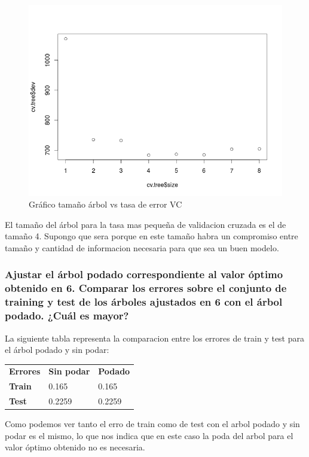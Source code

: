 \begin{figure}[H]
\centering
\includegraphics[scale=0.60]{ej2-6.png}
\caption{Gráfico tamaño árbol vs tasa de error VC}
\label{}
\end{figure}

El tamaño del árbol para la tasa mas pequeña de validacion cruzada es el de tamaño 4. Supongo que sera porque en este tamaño habra un compromiso entre tamaño y cantidad de informacion necesaria para que sea un buen modelo.

\subsubsection{Ajustar el árbol podado correspondiente al valor óptimo obtenido en 6. Comparar los errores sobre el conjunto de training y test de los árboles ajustados en 6 con el árbol podado. ¿Cuál es mayor?}
La siguiente tabla representa la comparacion entre los errores de train y test para el árbol podado y sin podar:\\
\begin{tabular}{lll}
	\textbf{Errores} & \textbf{Sin podar} & \textbf{Podado}\\
	\textbf{Train} & 0.165 &  0.165\\
	\textbf{Test} & 0.2259 & 0.2259\\
\end{tabular}

Como podemos ver tanto el erro de train como de test con el arbol podado y sin podar es el mismo, lo que nos indica que en este caso la poda del arbol para el valor óptimo obtenido no es necesaria.

